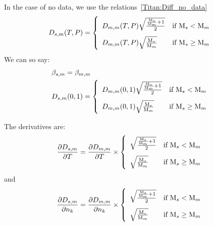 In the case of no data, we use the relations~\ref{Titan:Diff_no_data}
\begin{equation}
\renewcommand{\arraystretch}{2}
\diff_{s,m}(T,P) =
                   \left\{\begin{array}{l@{\quad}r}
                          \diff_{m,m}(T,P)\sqrt{\frac{\frac{\Mm_s}{\Mm_m} + 1}{2}} & \text{if }\Mm_s < \Mm_m    \\
                          \diff_{m,m}(T,P)\sqrt{\frac{\Mm_s}{\Mm_m}}               & \text{if }\Mm_s \geq \Mm_m \\
                   \end{array}\right.
\label{Titan:Diff_no_data}
\end{equation}
%
We can so say:
%
\begin{equation}
\begin{split}
\renewcommand{\arraystretch}{2}
 & \smas{s,m} = \smas{m,m} \\ 
 & \Amas{s,m} =
               \left\{\begin{array}{l@{\quad}r}
                      \Amas{m,m}\sqrt{\frac{\frac{\Mm_s}{\Mm_m} + 1}{2}} & \text{if }\Mm_s < \Mm_m    \\
                      \Amas{m,m}\sqrt{\frac{\Mm_s}{\Mm_m}}               & \text{if }\Mm_s \geq \Mm_m \\
               \end{array}\right.
\end{split}
\label{Titan:Diff_no_data_to_Massman}
\end{equation}

The derivatives are:
\begin{equation}
\doverd{\diff_{s,m}}{T} = \doverd{\diff_{m,m}}{T} \times
               \left\{\begin{array}{l@{\quad}r}
                      \sqrt{\frac{\frac{\Mm_s}{\Mm_m} + 1}{2}} & \text{if }\Mm_s < \Mm_m    \\
                      \sqrt{\frac{\Mm_s}{\Mm_m}}               & \text{if }\Mm_s \geq \Mm_m \\
               \end{array}\right.
\end{equation}
%
and
%
\begin{equation}
\doverd{\diff_{s,m}}{\conc_k} = \doverd{\diff_{m,m}}{\conc_k} \times
               \left\{\begin{array}{l@{\quad}r} 
                      \sqrt{\frac{\frac{\Mm_s}{\Mm_m} + 1}{2}} & \text{if }\Mm_s < \Mm_m    \\
                      \sqrt{\frac{\Mm_s}{\Mm_m}}               & \text{if }\Mm_s \geq \Mm_m \\
               \end{array}\right.
\end{equation}


